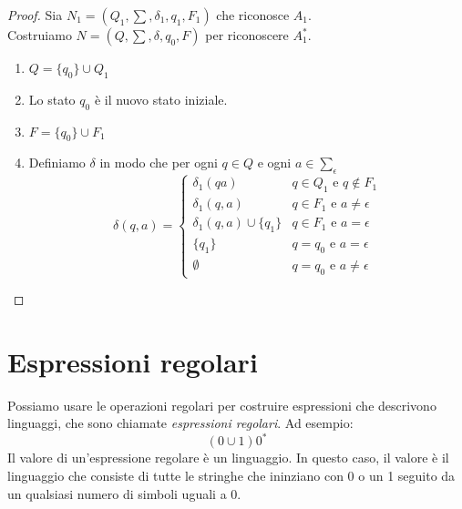 \documentclass[12pt]{report}
\begin{document}
	\begin{proof}
		Sia $N_1 = (Q_1, \sum, \delta_1, q_1, F_1)$ che riconosce $A_1$. \\
		Costruiamo $N = (Q, \sum, \delta, q_0, F)$ per riconoscere $A_1^*$.
		\begin{enumerate}
			\item $Q = \{q_0\} \cup Q_1$
			\item Lo stato $q_0$ è il nuovo stato iniziale.
			\item $F = \{q_0\} \cup F_1$
			\item Definiamo $\delta$ in modo che per ogni $q \in Q$ e ogni $a \in \sum_\epsilon$
			\[
			\delta(q, a) = \begin{cases}
				\delta_1(q a) & q \in Q_1 \text{ e } q \notin F_1 \\
				\delta_1(q, a) & q \in F_1 \text{ e } a \neq \epsilon \\
				\delta_1(q, a) \cup \{q_1\} & q \in F_1 \text{ e } a = \epsilon \\
				\{q_1\} & q = q_0 \text{ e } a = \epsilon \\
				\emptyset & q = q_0 \text{ e } a \neq \epsilon
			\end{cases}
			\]
		\end{enumerate}
	\end{proof}
	\section{Espressioni regolari}
	Possiamo usare le operazioni regolari per costruire espressioni che descrivono linguaggi, che sono chiamate \textit{espressioni regolari}. Ad esempio:
	\[
	(0 \cup 1)0^*
	\]
	Il valore di un'espressione regolare è un linguaggio. In questo caso, il valore è il linguaggio che consiste di tutte le stringhe che ininziano con 0 o un 1 seguito da un qualsiasi numero di simboli uguali a 0. \\
\end{document}
